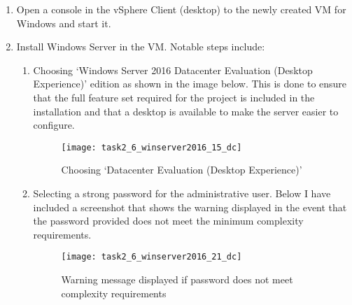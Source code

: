 \begin{enumerate}[resume*=task2methodology2]
  \item Open a console in the vSphere Client (desktop) to the newly created VM for Windows and start it.
  \item Install Windows Server in the VM. Notable steps include:
    \begin{enumerate}[label=(\alph*)]
      \item Choosing `Windows Server 2016 Datacenter Evaluation (Desktop Experience)' edition as shown in the image below. This is done to ensure that the full feature set required for the project is included in the installation and that a desktop is available to make the server easier to configure.
        \begin{figure}[H]
          \centering
          \captionsetup{skip=2pt}
          \texttt{[image: task2\_6\_winserver2016\_15\_dc]}
          \caption{Choosing `Datacenter Evaluation (Desktop Experience)'}
          \label{fig:task2:vspherec_windc1}
        \end{figure}
      \item Selecting a strong password for the administrative user. Below I have included a screenshot that shows the warning displayed in the event that the password provided does not meet the minimum complexity requirements.
        \begin{figure}[H]
          \centering
          \captionsetup{skip=2pt}
          \texttt{[image: task2\_6\_winserver2016\_21\_dc]}
          \caption{Warning message displayed if password does not meet complexity requirements}
          \label{fig:task2:vspherec_windc2}
        \end{figure}
    \end{enumerate}
\end{enumerate}

\noindent {}

